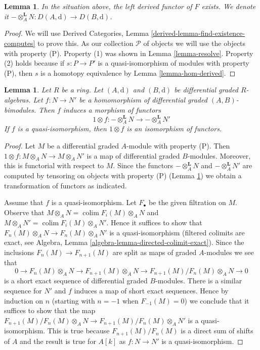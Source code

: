 \documentclass{stacks-project}
\theoremstyle{plain}
\newtheorem{lemma}[subsection]{Lemma}
\theoremstyle{definition}
\theoremstyle{remark}
\numberwithin{equation}{subsection}
\def\colim{\mathop{\mathrm{colim}}\nolimits}
\begin{document}
\begin{lemma}
\label{lemma-derived-bc}
In the situation above, the left derived functor of $F$ exists.
We denote it
$- \otimes_A^\mathbf{L} N : D(A, \text{d}) \to D(B, \text{d})$.
\end{lemma}

\begin{proof}
We will use
Derived Categories, Lemma \ref{derived-lemma-find-existence-computes}
to prove this. As our collection $\mathcal{P}$
of objects we will use the objects with property (P).
Property (1) was shown in Lemma \ref{lemma-resolve}.
Property (2) holds because if $s : P \to P'$ is a quasi-isomorphism
of modules with property (P), then $s$ is a homotopy equivalence
by Lemma \ref{lemma-hom-derived}.
\end{proof}

\begin{lemma}
\label{lemma-functoriality-bc}
Let $R$ be a ring. Let $(A, \text{d})$ and $(B, \text{d})$ be
differential graded $R$-algebras. Let $f : N \to N'$ be a
homomorphism of differential graded $(A, B)$-bimodules.
Then $f$ induces a morphism of functors
$$
1\otimes f :
- \otimes_A^\mathbf{L} N
\longrightarrow
- \otimes_A^\mathbf{L} N'
$$
If $f$ is a quasi-isomorphism, then $1 \otimes f$ is an isomorphism of
functors.
\end{lemma}

\begin{proof}
Let $M$ be a differential graded $A$-module with property (P).
Then $1 \otimes f : M \otimes_A N \to M \otimes_A N'$ is a
map of differential graded $B$-modules. Moreover, this is functorial
with respect to $M$. Since the functors
$- \otimes_A^\mathbf{L} N$ and $- \otimes_A^\mathbf{L} N'$ are
computed by tensoring on objects with property (P)
(Lemma \ref{lemma-derived-bc}) we obtain a transformation of functors
as indicated.

\medskip\noindent
Assume that $f$ is a quasi-isomorphism. Let $F_\bullet$ be the
given filtration on $M$. Observe that
$M \otimes_A N = \colim F_i(M) \otimes_A N$ and
$M \otimes_A N' = \colim F_i(M) \otimes_A N'$.
Hence it suffices to show that
$F_n(M) \otimes_A N \to F_n(M) \otimes_A N'$
is a quasi-isomorphism (filtered colimits are exact, see
Algebra, Lemma \ref{algebra-lemma-directed-colimit-exact}).
Since the inclusions $F_n(M) \to F_{n + 1}(M)$
are split as maps of graded $A$-modules we see that
$$
0 \to F_n(M) \otimes_A N \to F_{n + 1}(M) \otimes_A N \to
F_{n + 1}(M)/F_n(M) \otimes_A N \to 0
$$
is a short exact sequence of differential graded $B$-modules.
There is a similar sequence for $N'$ and $f$ induces a map
of short exact sequences. Hence by induction on $n$ (starting with $n = -1$
when $F_{-1}(M) = 0$) we conclude that it suffices to show that
the map $F_{n + 1}(M)/F_n(M) \otimes_A N \to F_{n + 1}(M)/F_n(M) \otimes_A N'$
is a quasi-isomorphism. This is true because $F_{n + 1}(M)/F_n(M)$
is a direct sum of shifts of $A$ and the result is true for $A[k]$
as $f : N \to N'$ is a quasi-isomorphism.
\end{proof}
\end{document}
